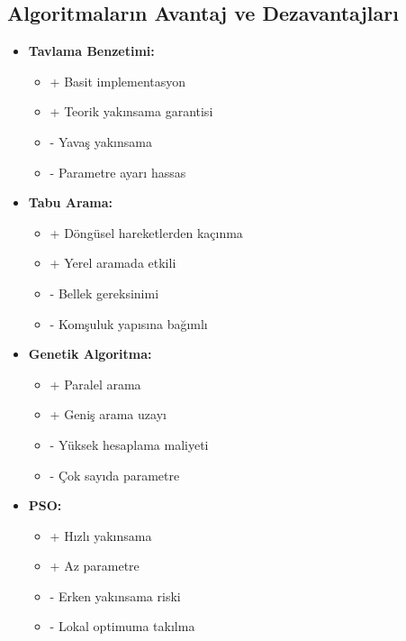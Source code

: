 
\subsection{Algoritmaların Avantaj ve Dezavantajları}

\begin{tcolorbox}[title=Karşılaştırmalı Analiz]
\begin{itemize}
    \item \textbf{Tavlama Benzetimi:}
        \begin{itemize}
            \item + Basit implementasyon
            \item + Teorik yakınsama garantisi
            \item - Yavaş yakınsama
            \item - Parametre ayarı hassas
        \end{itemize}
    \item \textbf{Tabu Arama:}
        \begin{itemize}
            \item + Döngüsel hareketlerden kaçınma
            \item + Yerel aramada etkili
            \item - Bellek gereksinimi
            \item - Komşuluk yapısına bağımlı
        \end{itemize}
    \item \textbf{Genetik Algoritma:}
        \begin{itemize}
            \item + Paralel arama
            \item + Geniş arama uzayı
            \item - Yüksek hesaplama maliyeti
            \item - Çok sayıda parametre
        \end{itemize}
    \item \textbf{PSO:}
        \begin{itemize}
            \item + Hızlı yakınsama
            \item + Az parametre
            \item - Erken yakınsama riski
            \item - Lokal optimuma takılma
        \end{itemize}
\end{itemize}
\end{tcolorbox} 

